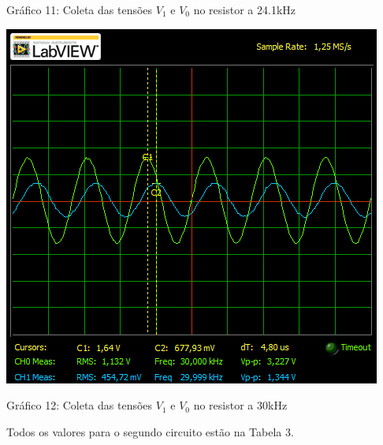 \documentclass[a4 paper]{article}
\begin{document}
\begin{center}
Gráfico 11: Coleta das tensões $V_1$ e $V_0$ no resistor a 24.1kHz
\end{center}

\begin{table}[h]
\centering
\includegraphics[scale=0.7]{graficos/circ2/rgadicoa2-2-30}
\end{table}

\begin{center}
Gráfico 12: Coleta das tensões $V_1$ e $V_0$ no resistor a 30kHz
\end{center}

Todos os valores para o segundo circuito estão na Tabela 3.

\newpage



\end{document}
